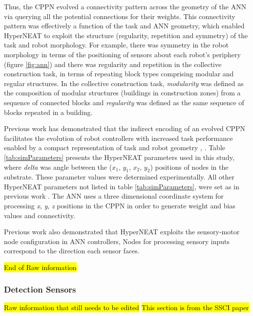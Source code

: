 \documentclass[conference]{IEEEtran}
\begin{document}
Thus, the CPPN evolved a connectivity pattern across the geometry of the ANN via querying all the potential
connections for their weights.
This connectivity pattern was effectively a function of the task and ANN geometry,
which enabled HyperNEAT to exploit the structure (regularity, repetition and symmetry) of the task and robot morphology.
For example, there was symmetry in the robot morphology in terms of the positioning of sensors about each
robot's periphery (figure \ref{fig:ann}) and there was regularity and repetition in the collective construction
task, in terms of repeating block types comprising modular and regular structures.
In the collective construction task, \textit{modularity} was defined as the composition of modular structures
(buildings in construction zones) from a sequence of connected blocks and \textit{regularity} was defined
as the same sequence of blocks repeated in a building.

Previous work has demonstrated that the indirect encoding of an evolved CPPN facilitates the evolution of
robot controllers with increased task performance enabled by a compact representation
of task and robot geometry \cite{DAmbrosioStanley2008}, \cite{WatsonNitschke2015SSCI}.
Table \ref{tab:simParameters} presents the HyperNEAT parameters used in this study, where \textit{delta}
was angle between the ($x_{1}$, $y_{1}$, $x_{2}$, $y_{2}$) positions of nodes in the substrate.
These parameter values were determined experimentally.   All other HyperNEAT parameters not listed in
table \ref{tab:simParameters}, were set as in previous work \cite{DAmbrosioStanley2008}.
The ANN uses a three dimensional coordinate system for processing \textit{x}, \textit{y}, \textit{z}
positions in the CPPN in order to generate weight and bias values and connectivity.

Previous work  also demonstrated that HyperNEAT exploits the sensory-motor node configuration in ANN controllers,
Nodes for processing sensory inputs correspond to the direction each sensor faces.

\hl{End of Raw information}

\subsubsection{Detection Sensors}

\hl{Raw information that still needs to be edited}
\hl{This section is from the SSCI paper}
\end{document}
